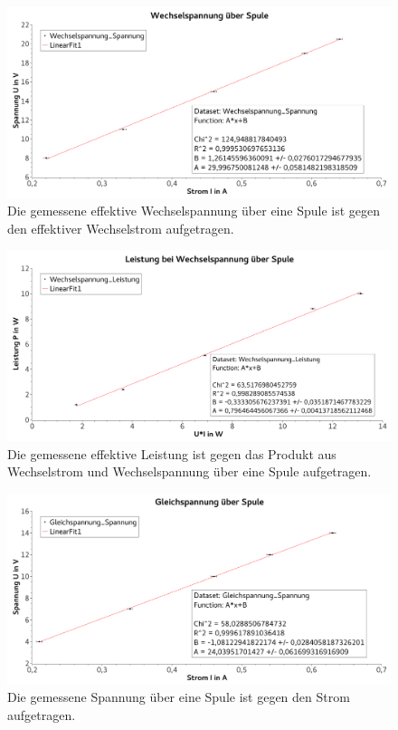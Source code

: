\documentclass[
	a4paper,
	12pt,
	pagesize,
	ngerman
]{scrartcl}
\begin{document}
	\begin{figure}[tb]
		\includegraphics[width=1\textwidth]{SpuleSpannungWechsel}
		\centering
		\caption{Die gemessene effektive Wechselspannung über eine Spule ist gegen den effektiver Wechselstrom aufgetragen.}
		\label{SpuleSpannungWechsel}
		\centering
	\end{figure}
	\begin{figure}[tb]
		\includegraphics[width=1\textwidth]{SpuleLeistungWechsel}
		\centering
		\caption{Die gemessene effektive Leistung ist gegen das Produkt aus Wechselstrom und Wechselspannung über eine Spule aufgetragen.}
		\label{SpuleLeistungWechsel}
		\centering
	\end{figure}
	\begin{figure}[tb]
		\includegraphics[width=1\textwidth]{SpuleSpannungGleich}
		\centering
		\caption{Die gemessene Spannung über eine Spule ist gegen den Strom aufgetragen.}
		\label{SpuleSpannungGleich}
		\centering
	\end{figure}
\end{document}
